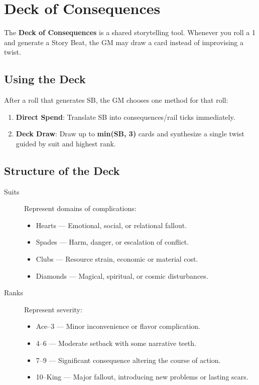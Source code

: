 \section{Deck of Consequences}

The \textbf{Deck of Consequences} is a shared storytelling tool. Whenever you roll a 1 and generate a Story Beat, the GM may draw a card instead of improvising a twist.

\subsection*{Using the Deck}

After a roll that generates SB, the GM chooses one method for that roll:
\begin{enumerate}
  \item \textbf{Direct Spend}: Translate SB into consequences/rail ticks immediately.
  \item \textbf{Deck Draw}: Draw up to \textbf{min(SB, 3)} cards and synthesize a single twist guided by suit and highest rank.
\end{enumerate}

\subsection*{Structure of the Deck}

\begin{description}
  \item[Suits] Represent domains of complications:
    \begin{itemize}
      \item Hearts — Emotional, social, or relational fallout.
      \item Spades — Harm, danger, or escalation of conflict.
      \item Clubs — Resource strain, economic or material cost.
      \item Diamonds — Magical, spiritual, or cosmic disturbances.
    \end{itemize}
  \item[Ranks] Represent severity:
    \begin{itemize}
      \item Ace–3 — Minor inconvenience or flavor complication.
      \item 4–6 — Moderate setback with some narrative teeth.
      \item 7–9 — Significant consequence altering the course of action.
      \item 10–King — Major fallout, introducing new problems or lasting scars.
    \end{itemize}
\end{description}

